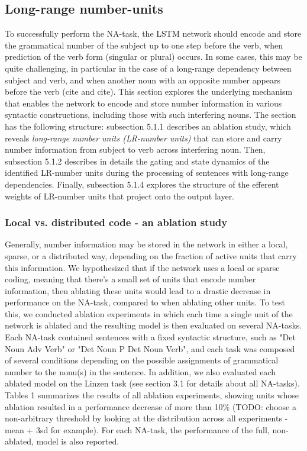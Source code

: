 \subsection{Long-range number-units}
To successfully perform the NA-task, the LSTM network should encode and store the grammatical number of the subject up to one step before the verb, when prediction of the verb form (singular or plural) occurs. In some cases, this may be quite challenging, in particular in the case of a long-range dependency between subject and verb, and when another noun with an opposite number appears before the verb (cite and cite). This section explores the underlying mechanism that enables the network to encode and store number information in various syntactic constructions, including those with such interfering nouns. The section has the following structure: subsection 5.1.1 describes an ablation study, which reveals \textit{long-range number units (LR-number units)} that can store and carry number information from subject to verb across interfering noun. Then, subsection 5.1.2 describes in details the gating and state dynamics of the identified LR-number units during the processing of sentences with long-range dependencies. Finally, subsection 5.1.4 explores the structure of the efferent weights of LR-number units that project onto the output layer.

\subsubsection{Local vs. distributed code - an ablation study}
Generally, number information may be stored in the network in either a local, sparse, or a distributed way, depending on the fraction of active units that carry this information. We hypothesized that if the network uses a local or sparse coding, meaning that there's a small set of units that encode number information, then ablating these units would lead to a drastic decrease in performance on the NA-task, compared to when ablating other units. To test this, we conducted ablation experiments in which each time a single unit of the network is ablated and the resulting model is then evaluated on several NA-tasks. Each NA-task contained sentences with a fixed syntactic structure, such as "Det Noun Adv Verb" or "Det Noun P Det Noun Verb", and each task was composed of several conditions depending on the possible assignments of grammatical number to the nonu(s) in the sentence. In addition, we also evaluated each ablated model on the Linzen task (see section 3.1 for details about all NA-tasks). Tables 1 summarizes the results of all ablation experiments, showing units whose ablation resulted in a performance decrease of more than 10\% (TODO: choose a non-arbitrary threshold by looking at the distribution across all experiments - mean + 3sd for example). For each NA-task, the performance of the full, non-ablated, model is also reported.


